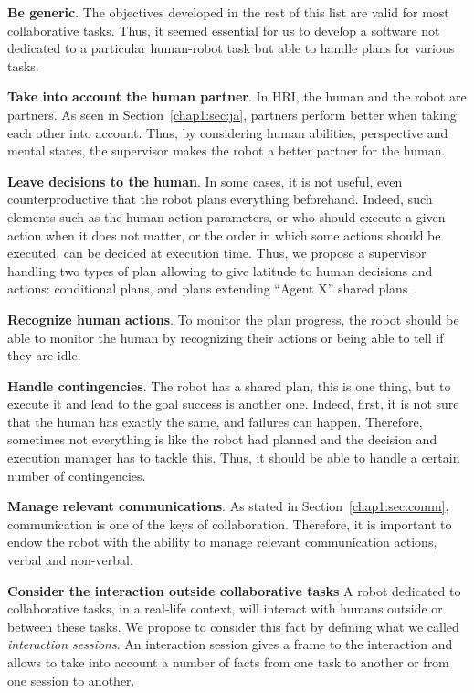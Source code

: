 \documentclass[a4paper,11pt,twoside]{StyleThese}
\begin{document}
\begin{bulletList}
	\item \textbf{Be generic}. The objectives developed in the rest of this list are valid for most collaborative tasks. Thus, it seemed essential for us to develop a software not dedicated to a particular human-robot task but able to handle plans for various tasks. 
	\item \textbf{Take into account the human partner}. In HRI, the human and the robot are partners. As seen in Section~\ref{chap1:sec:ja}, partners perform better when taking each other into account. Thus, by considering human abilities, perspective and mental states, the supervisor makes the robot a better partner for the human.
	\item \textbf{Leave decisions to the human}. In some cases, it is not useful, even counterproductive that the robot plans everything beforehand. Indeed, such elements such as the human action parameters, or who should execute a given action when it does not matter, or the order in which some actions should be executed, can be decided at execution time. Thus, we propose a supervisor handling two types of plan allowing to give latitude to human decisions and actions: conditional plans, and plans extending ``Agent X'' shared plans~\citep{devin_2017_decisions}.
	\item \textbf{Recognize human actions}. To monitor the plan progress, the robot should be able to monitor the human by recognizing their actions or being able to tell if they are idle.
	\item \textbf{Handle contingencies}. The robot has a shared plan, this is one thing, but to execute it and lead to the goal success is another one. Indeed, first, it is not sure that the human has exactly the same, and failures can happen. Therefore, sometimes not everything is like the robot had planned and the decision and execution manager has to tackle this. Thus, it should be able to handle a certain number of contingencies.
	\item \textbf{Manage relevant communications}. As stated in Section~\ref{chap1:sec:comm}, communication is one of the keys of collaboration. Therefore, it is important to endow the robot with the ability to manage relevant communication actions, verbal and non-verbal.
	\item \textbf{Consider the interaction outside collaborative tasks} A robot dedicated to collaborative tasks, in a real-life context, will interact with humans outside or between these tasks. We propose to consider this fact by defining what we called \textit{interaction sessions}. An interaction session gives a frame to the interaction and allows to take into account a number of facts from one task to another or from one session to another.

\end{bulletList}
\end{document}
